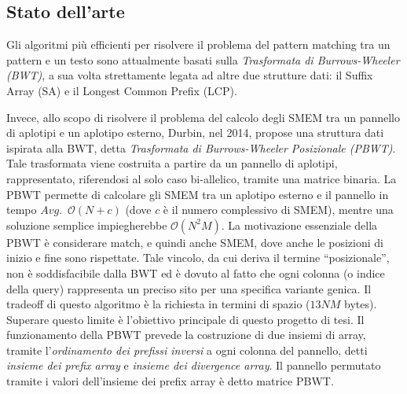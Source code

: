 \documentclass[a4paper,11pt, oneside,italian]{article}
\begin{document}
\subsection*{Stato dell'arte}
Gli algoritmi più efficienti per risolvere il problema del pattern matching tra
un pattern e un testo 
sono attualmente basati sulla \emph{Trasformata di Burrows-Wheeler (BWT)}, a sua
volta strettamente legata ad altre due strutture dati: il Suffix Array (SA) e
il Longest Common Prefix (LCP). 

Invece, allo scopo di risolvere il problema del calcolo degli SMEM tra un
pannello di aplotipi e un aplotipo esterno,
Durbin, nel 2014, propose una struttura dati ispirata alla BWT, detta
\textit{Trasformata di Burrows-Wheeler Posizionale (PBWT)}. Tale trasformata
viene costruita a partire da un pannello di aplotipi, rappresentato, riferendosi
al solo caso bi-allelico, tramite una matrice binaria.
La PBWT permette di calcolare gli SMEM tra
un aplotipo esterno e il pannello in tempo $Avg.\,\,\,\mathcal{O}(N+c)$ (dove 
$c$ è il numero complessivo di SMEM), mentre 
una soluzione semplice impiegherebbe $\mathcal{O}(N^2M)$.
La motivazione essenziale della PBWT è considerare match, e quindi anche SMEM,
dove anche le posizioni di inizio e fine sono rispettate.
Tale vincolo, da cui deriva il termine
``posizionale'', non è soddisfacibile dalla BWT ed è dovuto al fatto che ogni 
colonna (o indice della query) rappresenta un preciso sito per una specifica
variante genica. Il tradeoff di questo algoritmo è la richiesta in termini di
spazio ($13NM$ 
bytes). Superare questo limite è l'obiettivo principale di
questo progetto di tesi.
Il funzionamento della PBWT prevede la costruzione di due insiemi di
array, tramite 
l'\textit{ordinamento dei prefissi inversi} a ogni colonna del pannello, detti
\textit{insieme dei prefix array} e \textit{insieme dei divergence array}.
Il pannello permutato tramite i valori dell'insieme dei prefix array è
detto matrice PBWT.
\end{document}
